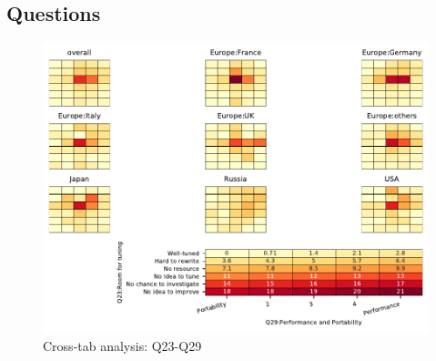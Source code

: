 
\subsection{Questions}


\begin{figure}
\begin{center}
\includegraphics[width=12cm]{../pdfs/Q23-Q29.pdf}
\caption{Cross-tab analysis: Q23-Q29}
\label{fig:Q23-Q29}
\end{center}
\end{figure}
